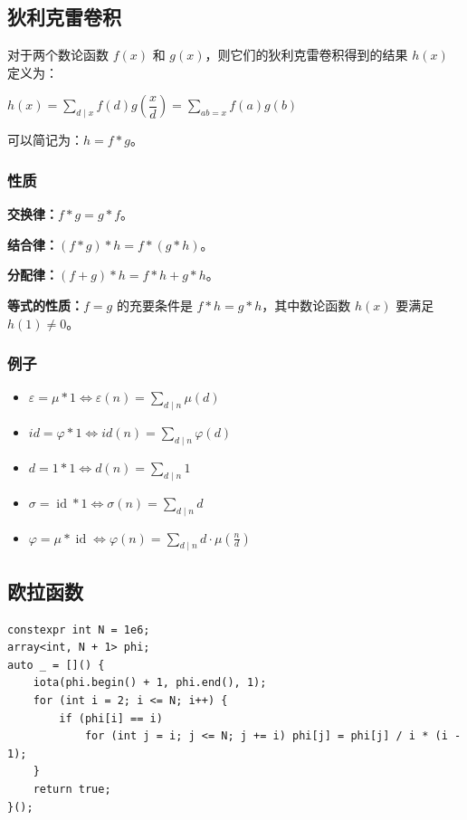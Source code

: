 \documentclass[UTF8, twoside]{ctexart}
\begin{document}
\begin{sloppypar}
\subsection{狄利克雷卷积}

对于两个数论函数 $f(x)$ 和 $g(x)$，则它们的狄利克雷卷积得到的结果 $h(x)$ 定义为：

$h(x)=\sum_{d\mid x}{f(d)g\left(\dfrac xd \right)}=\sum_{ab=x}{f(a)g(b)}$

可以简记为：$h=f*g$。

\subsubsection{性质}

\textbf{交换律：}$f*g=g*f$。

\textbf{结合律：}$(f*g)*h=f*(g*h)$。

\textbf{分配律：}$(f+g)*h=f*h+g*h$。

\textbf{等式的性质：}$f=g$ 的充要条件是 $f*h=g*h$，其中数论函数 $h(x)$ 要满足 $h(1)\ne 0$。

\subsubsection{例子}

\begin{itemize}
   \item $\varepsilon=\mu \ast 1\iff\varepsilon(n)=\sum_{d\mid n}\mu(d)$
   \item $id = \varphi * 1 \iff id(n)=\sum_{d\mid n} \varphi(d)$
   \item $d=1 \ast 1\iff d(n)=\sum_{d\mid n}1$
   \item $\sigma=\operatorname{id} \ast 1\iff\sigma(n)=\sum_{d\mid n}d$
   \item $\varphi=\mu \ast \operatorname{id}\iff\varphi(n)=\sum_{d\mid n}d\cdot\mu(\frac{n}{d})$
\end{itemize}

\subsection{欧拉函数}

\begin{lstlisting}[style=cpp]
constexpr int N = 1e6;
array<int, N + 1> phi;
auto _ = []() {
    iota(phi.begin() + 1, phi.end(), 1);
    for (int i = 2; i <= N; i++) {
        if (phi[i] == i)
            for (int j = i; j <= N; j += i) phi[j] = phi[j] / i * (i - 1);
    }
    return true;
}();
\end{lstlisting}


\end{sloppypar}
\end{document}
